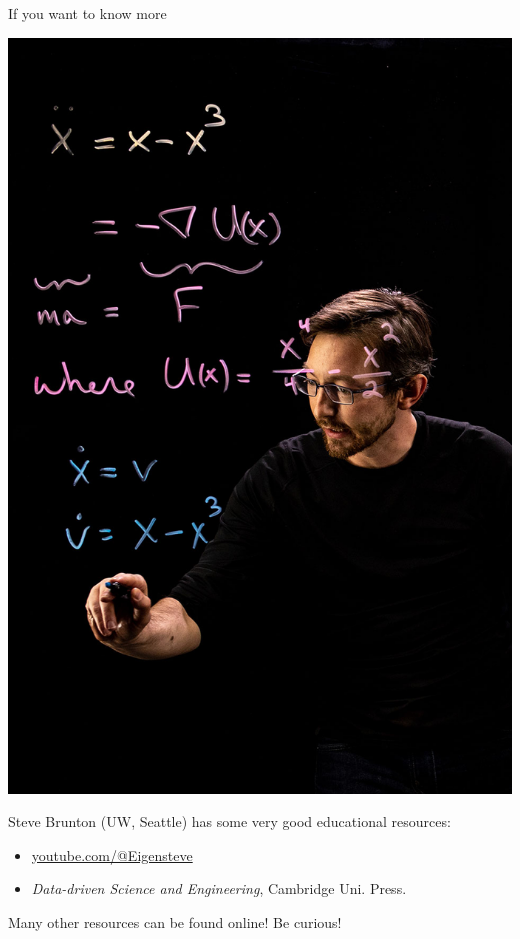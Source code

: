 \documentclass[aspectratio=169,compress,12pt,dvipsnames]{beamer}
\begin{document}
\begin{frame}{If you want to know more}
  \vfill
  \begin{minipage}{.28\textwidth}
    \centering
    \includegraphics[width=\textwidth]{steve.jpg}
  \end{minipage}%
  \hfill
  \begin{minipage}{.68\textwidth}
    Steve Brunton (UW, Seattle) has some very good educational resources:
    \par\medskip
    \begin{itemize}
      \item[\faYoutube] \url{youtube.com/@Eigensteve}
      \item[\faBook]  \emph{Data-driven Science and Engineering}, Cambridge Uni. Press.
    \end{itemize}
    \par\medskip
    Many other resources can be found online! Be curious!
  \end{minipage}
  \vfill
\end{frame}
\end{document}
